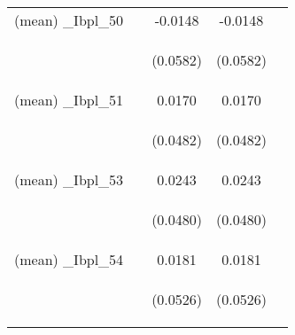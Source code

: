 \documentclass[]{article}
\begin{document}
\begin{center}
\begin{tabular}{lcccc}
(mean) \_Ibpl\_50 &  & -0.0148 & -0.0148 &  \\
\vspace{4pt} & \begin{footnotesize}\end{footnotesize} & \begin{footnotesize}(0.0582)\end{footnotesize} & \begin{footnotesize}(0.0582)\end{footnotesize} & \begin{footnotesize}\end{footnotesize} \\
(mean) \_Ibpl\_51 &  & 0.0170 & 0.0170 &  \\
\vspace{4pt} & \begin{footnotesize}\end{footnotesize} & \begin{footnotesize}(0.0482)\end{footnotesize} & \begin{footnotesize}(0.0482)\end{footnotesize} & \begin{footnotesize}\end{footnotesize} \\
(mean) \_Ibpl\_53 &  & 0.0243 & 0.0243 &  \\
\vspace{4pt} & \begin{footnotesize}\end{footnotesize} & \begin{footnotesize}(0.0480)\end{footnotesize} & \begin{footnotesize}(0.0480)\end{footnotesize} & \begin{footnotesize}\end{footnotesize} \\
(mean) \_Ibpl\_54 &  & 0.0181 & 0.0181 &  \\
\vspace{4pt} & \begin{footnotesize}\end{footnotesize} & \begin{footnotesize}(0.0526)\end{footnotesize} & \begin{footnotesize}(0.0526)\end{footnotesize} & \begin{footnotesize}\end{footnotesize} \\

\end{tabular}
\end{center}
\end{document}
